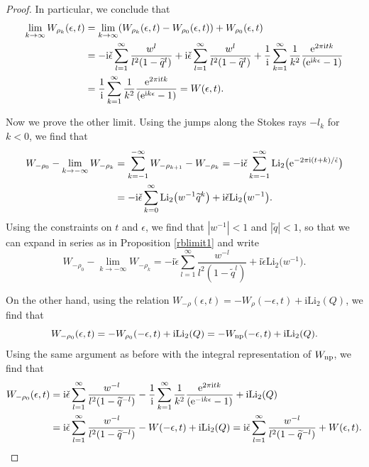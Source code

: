 \documentclass[pdftex]{sigma}
\numberwithin{equation}{section}
\begin{document}
\begin{proof}
In particular, we conclude that
\begin{align*}
 \lim_{k\to \infty}W_{\rho_k}(\epsilon,t)&=\lim_{k\to \infty}(W_{\rho_k}(\epsilon,t)-W_{\rho_0}(\epsilon,t))+W_{\rho_0}(\epsilon,t)\\
 &=-\mathrm{i}\check\epsilon\sum_{l=1}^\infty\frac{w^l}{l^2(1-\widetilde{q}^l)} +\mathrm{i}\check\epsilon\sum_{l=1}^\infty\frac{w^l}{l^2(1-\widetilde{q}^l)}
 +\frac{1}{\mathrm{i}} \sum_{k=1}^{\infty} \frac{1}{k^2} \frac{{\rm e}^{2\pi \mathrm{i} t k}}{({\rm e}^{\mathrm{i} k \epsilon}-1)}\\
 &=\frac{1}{\mathrm{i}} \sum_{k=1}^{\infty} \frac{1}{k^2} \frac{{\rm e}^{2\pi \mathrm{i} t k}}{({\rm e}^{\mathrm{i} k \epsilon}-1)}
 =W(\epsilon,t).
 \end{align*}

Now we prove the other limit. Using the jumps along the Stokes rays $-l_{k}$ for $k<0$, we find that
\begin{align*}
 W_{-\rho_0}-\lim_{k\to -\infty}W_{-\rho_k}&=\sum_{k=-1}^{-\infty}W_{-\rho_{k+1}}-W_{-\rho_{k}}
 =- \mathrm{i}\check{\epsilon}\sum_{k=-1}^{-\infty} \mathrm{Li}_2\big({\rm e}^{-2\pi \mathrm i(t+k)/\check \epsilon}\big)\\
 &=-\mathrm{i}\check{\epsilon}\sum_{k=0}^{\infty} \mathrm{Li}_2\big(w^{-1}\widetilde{q}^k\big)+\mathrm{i}\check{\epsilon}\mathrm{Li}_2\big(w^{-1}\big).
\end{align*}
Using the constraints on $t$ and $\epsilon$, we find that $|w^{-1}|<1$ and $|\widetilde{q}|<1$, so that we can expand in series as in Proposition \ref{rblimit1} and write
\begin{equation*}
 W_{-\rho_0}-\lim_{k\to -\infty}W_{-\rho_k}=-\mathrm{i}\check\epsilon\sum_{l=1}^\infty\frac{w^{-l}}{l^2(1-\widetilde{q}^l)}+\mathrm{i}\check{\epsilon}\mathrm{Li}_2\big(w^{-1}\big).
\end{equation*}

On the other hand, using the relation $W_{-\rho}(\epsilon,t)=-W_{\rho}(-\epsilon,t)+\mathrm{i}\mathrm{Li}_2(Q)$, we find that
\begin{equation*}
 W_{-\rho_0}(\epsilon,t)=-W_{\rho_0}(-\epsilon,t)+\mathrm{i}\mathrm{Li}_2(Q)=-W_{\rm np}(-\epsilon,t)+\mathrm{i}\mathrm{Li}_2(Q).
\end{equation*}
 Using the same argument as before with the integral representation of $W_{\rm np}$, we find that
\begin{align*}
 W_{-\rho_0}(\epsilon,t)&=\mathrm{i}\check\epsilon\sum_{l=1}^\infty\frac{w^{-l}}{l^2(1-\widetilde{q}^{-l})}
 -\frac{1}{\mathrm{i}} \sum_{k=1}^{\infty} \frac{1}{k^2} \frac{{\rm e}^{2\pi \mathrm{i} t k}}{({\rm e}^{-\mathrm{i} k \epsilon}-1)}+\mathrm{i}\mathrm{Li}_2(Q)\\
 &=\mathrm{i}\check\epsilon\sum_{l=1}^\infty\frac{w^{-l}}{l^2(1-\widetilde{q}^{-l})}-
 W(-\epsilon,t)+\mathrm{i}\mathrm{Li}_2(Q)
 =\mathrm{i}\check\epsilon\sum_{l=1}^\infty\frac{w^{-l}}{l^2(1-\widetilde{q}^{-l})}+W(\epsilon,t).
 \end{align*}


\end{proof}
\end{document}
